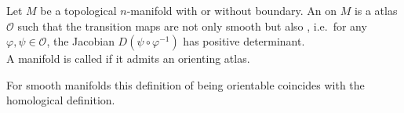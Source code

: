 \documentclass[a4paper,11pt]{article}
\begin{document}
\begin{definition}
    Let \(M\) be a topological \(n\)-manifold with or without boundary. An  on \(M\) is a atlas \(\mathcal{O}\) such that the transition maps are not only smooth but also , i.e.\ for any \(\varphi,\psi\in\mathcal{O}\), the Jacobian \(D(\psi\circ\varphi^{-1})\) has positive determinant.\\
    A manifold is called  if it admits an orienting atlas.
\end{definition}

\begin{remark}
    For smooth manifolds this definition of being orientable coincides with the homological definition.
\end{remark}







\end{document}
